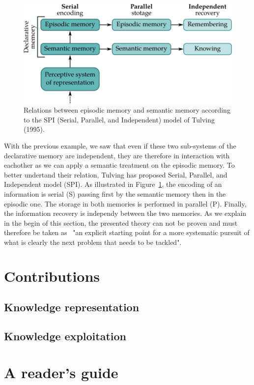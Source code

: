 \begin{figure}[h!]
\centering
\includegraphics[scale=0.45]{figures/introduction/SPI.png}
\caption{\label{fig:SPI} Relations between episodic memory and semantic memory according to the SPI (Serial, Parallel, and Independent) model of Tulving (1995).}
\end{figure}

With the previous example, we saw that even if these two sub-systems of the declarative memory are independent, they are therefore in interaction with eachother as we can apply a semantic treatment on the episodic memory. To better undertand their relation, Tulving has proposed Serial, Parallel, and Independent model (SPI). As illustrated in Figure~\ref{fig:SPI}, the encoding of an information is serial (S) passing first by the semantic memory then in the episodic one. The storage in both memories is performed in parallel (P). Finally, the information recovery is independy between the two memories.
As we explain in the begin of this section, the presented theory can not be proven and must therefore be taken as~\cite{tulving_1995_organization} "an explicit starting point for a more systematic pursuit of what is clearly the next problem that needs to be tackled".

\section{Contributions}

\subsection{Knowledge representation}

\subsection{Knowledge exploitation}

\section{A reader's guide}


